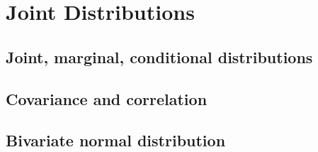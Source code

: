 
\section{Joint Distributions}

\subsection{Joint, marginal, conditional distributions}


\subsection{Covariance and correlation}


\subsection{Bivariate normal distribution}

